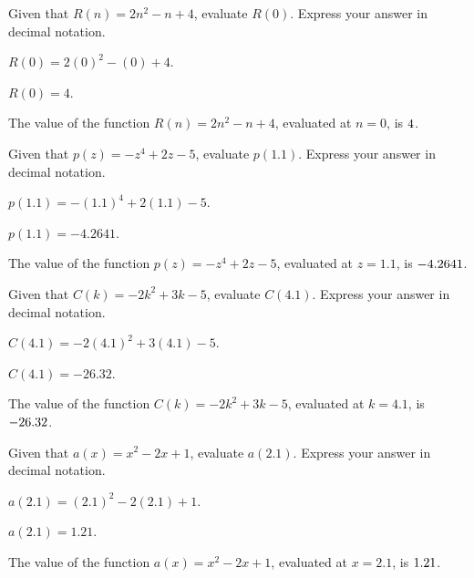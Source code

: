 \begin{shuffle}
\begin{exercise}
Given that $R(n)=2 n^2-n+4$, evaluate $R(0)$. Express your answer in decimal notation.
\begin{solution}
\begin{hint}
$R(0)=2 (0)^2-(0)+4$.
\end{hint}
\begin{hint}
$R(0)=4$.
\end{hint}
The value of the function $R(n)=2 n^2-n+4$, evaluated at $n=0$, is ${4}$.
\end{solution}
\end{exercise}

\begin{exercise}
Given that $p(z)=-z^4+2 z-5$, evaluate $p(1.1)$. Express your answer in decimal notation.
\begin{solution}
\begin{hint}
$p(1.1)=-(1.1)^4+2 (1.1)-5$.
\end{hint}
\begin{hint}
$p(1.1)=-4.2641$.
\end{hint}
The value of the function $p(z)=-z^4+2 z-5$, evaluated at $z=1.1$, is ${-4.2641}$.
\end{solution}
\end{exercise}

\begin{exercise}
Given that $C(k)=-2 k^2+3 k-5$, evaluate $C(4.1)$. Express your answer in decimal notation.
\begin{solution}
\begin{hint}
$C(4.1)=-2 (4.1)^2+3 (4.1)-5$.
\end{hint}
\begin{hint}
$C(4.1)=-26.32$.
\end{hint}
The value of the function $C(k)=-2 k^2+3 k-5$, evaluated at $k=4.1$, is ${-26.32}$.
\end{solution}
\end{exercise}

\begin{exercise}
Given that $a(x)=x^2-2 x+1$, evaluate $a(2.1)$. Express your answer in decimal notation.
\begin{solution}
\begin{hint}
$a(2.1)=(2.1)^2-2 (2.1)+1$.
\end{hint}
\begin{hint}
$a(2.1)=1.21$.
\end{hint}
The value of the function $a(x)=x^2-2 x+1$, evaluated at $x=2.1$, is ${1.21}$.
\end{solution}
\end{exercise}


\end{shuffle}

